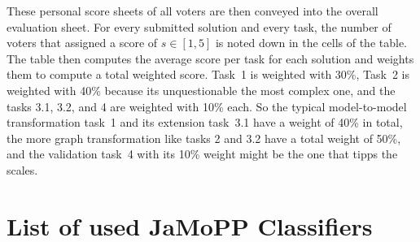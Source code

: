\documentclass[11pt]{article}
\begin{document}
These personal score sheets of all voters are then conveyed into the overall
evaluation sheet.  For every submitted solution and every task, the number of
voters that assigned a score of $s \in [1, 5]$ is noted down in the cells of
the table.  The table then computes the average score per task for each
solution and weights them to compute a total weighted score.  Task~1 is
weighted with 30\%, Task~2 is weighted with 40\% because its unquestionable the
most complex one, and the tasks 3.1, 3.2, and 4 are weighted with 10\% each.
So the typical model-to-model transformation task~1 and its extension task~3.1
have a weight of 40\% in total, the more graph transformation like tasks 2 and
3.2 have a total weight of 50\%, and the validation task~4 with its 10\% weight
might be the one that tipps the scales.








\clearpage
\appendix

\section{List of used JaMoPP Classifiers}
\label{sec:list-used-jamopp}
\end{document}
